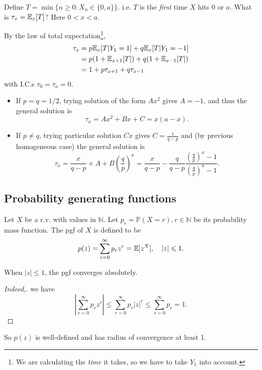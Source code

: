 \begin{example}
    Define $ T =\min \{n\ge 0: X_n\in \{0,a\}\} $. i.e. $T$ is the \textit{first} time $X$ hits $0$ or $a$. What is $ \tau_x = {\mathbb{E}}_x[T] $? Here $ 0<x<a $.

    By the law of total expectation\footnote{We are calculating the \textit{time} it takes, so we have to take $Y_1$ into account.},
    \begin{align*}
        \tau_x &= p{\mathbb{E}}_x[T|Y_1=1]+q{\mathbb{E}}_x[T|Y_1=-1]\\ 
        &= p(1+{\mathbb{E}}_{x+1}[T])+q(1+{\mathbb{E}}_{x-1}[T])\\ 
        &= 1+ p \tau_{x+1}+q \tau_{x-1}
    \end{align*}
    with I.C.s $ \tau_0=\tau_a=0 $.
    \begin{itemize}
        \item If $ p=q=1/2 $, trying solution of the form $ Ax^2 $ gives $A=-1$, and thus the general solution is 
        \[
            \tau_x = Ax^2+Bx+C = x(a-x).
        \]
        \item If $ p\neq q $, trying particular solution $ Cx $ gives $ C=\frac{1}{q-p} $ and (by previous homogeneous case) the general solution is 
        \[
            \tau_x = \frac{x}{q-p}+A+B\left( \frac{q}{p} \right)^x = \frac{x}{q-p}-\frac{q}{q-p}\frac{\left( \frac{q}{p} \right)^x-1}{\left( \frac{q}{p} \right)^a-1}.
        \]
    \end{itemize}
\end{example}

\subsection{Probability generating functions}
\begin{definition}
    Let $X$ be a r.v. with values in $ \mathbb{N} $. Let $ p_r = \mathbb{P}(X=r), r\in \mathbb{N} $ be its probability mass function. The pgf of $X$ is defined to be 
    \[
        p(z) = \sum_{r=0}^{\infty} p_r z^r = {\mathbb{E}}[z^X],\quad |z|\leqslant 1.
    \]
\end{definition}

\begin{claim}
    When $ |z|\le 1 $, the pgf converges absolutely.
\end{claim}
\begin{proof}[Indeed,]
    we have 
    \[
        \left| \sum_{r=0}^{\infty} p_r z^r \right| \le \sum_{r=0}^{\infty} p_r |z|^r\le \sum_{r=0}^{\infty}p_r=1.
    \]
\end{proof}
So $ p(z) $ is well-defined and has radius of convergence at least 1.

